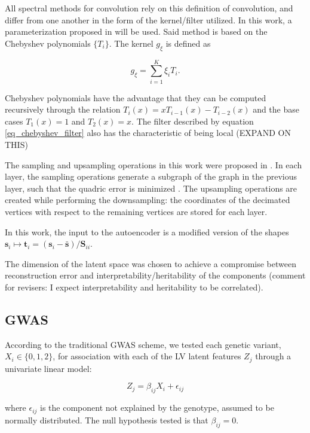 \documentclass[twocolumn]{llncs}
\begin{document}
All spectral methods for convolution rely on this definition of convolution, and differ from one another in the form of the kernel/filter utilized. In this work, a parameterization proposed in \cite{ref_spectral_graph_conv} will be used. 
Said method is based on the Chebyshev polynomials $\{T_i\}$. The kernel $g_\xi$ is defined as

\begin{equation}
g_{\xi}=\sum_{i=1}^{K}\xi_i T_i.
\label{eq_chebyshev_filter}
\end{equation}

Chebyshev polynomials have the advantage that they can be computed recursively through the relation $T_i(x)=xT_{i-1}(x)-T_{i-2}(x)$ and the base cases $T_1(x)=1$ and $T_2(x)=x$. The filter described by equation \ref{eq_chebyshev_filter} also has the characteristic of being local (EXPAND ON THIS)

The sampling and upsampling operations in this work were proposed in \cite{ref_coma}. In each layer, the sampling operations generate a subgraph of the graph in the previous layer, such that the quadric error is minimized \cite{ref_quadric_error}. The upsampling operations are created while performing the downsampling: the coordinates of the decimated vertices with respect to the remaining vertices are stored for each layer.

In this work, the input to the autoencoder is a modified version of the shapes $\textbf{s}_i\mapsto \textbf{t}_i=(\textbf{s}_i-\bar{\textbf{s}})/\textbf{S}_{ii}$.

The dimension of the latent space was chosen to achieve a compromise between reconstruction error and interpretability/heritability of the components (comment for revisers: I expect interpretability and heritability to be correlated).

\subsection{GWAS}
According to the traditional GWAS scheme, we tested each genetic variant, $X_i\in\{0,1,2\}$, for association with each of the LV latent features $Z_j$ through a univariate linear model:

\begin{equation}
Z_j = \beta_{ij}X_i+\epsilon_{ij}
\end{equation}

\noindent where $\epsilon_{ij}$ is the component not explained by the genotype, assumed to be normally distributed. The null hypothesis tested is that $\beta_{ij}=0$.
\end{document}
